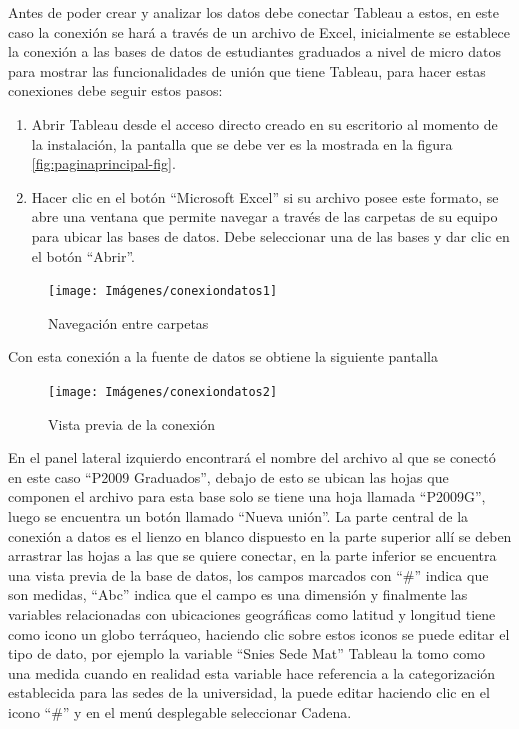 \documentclass[
]{book}
\begin{document}
Antes de poder crear y analizar los datos debe conectar Tableau a estos, en este caso la conexión se hará a través de un archivo de Excel, inicialmente se establece la conexión a las bases de datos de estudiantes graduados a nivel de micro datos para mostrar las funcionalidades de unión que tiene Tableau, para hacer estas conexiones debe seguir estos pasos:

\begin{enumerate}
\def\labelenumi{\arabic{enumi}.}
\item
  Abrir Tableau desde el acceso directo creado en su escritorio al momento de la instalación, la pantalla que se debe ver es la mostrada en la figura \ref{fig:paginaprincipal-fig}.
\item
  Hacer clic en el botón ``Microsoft Excel'' si su archivo posee este formato, se abre una ventana que permite navegar a través de las carpetas de su equipo para ubicar las bases de datos. Debe seleccionar una de las bases y dar clic en el botón ``Abrir''.
\end{enumerate}

\begin{figure}

{\centering \texttt{[image: Imágenes/conexiondatos1]} 

}

\caption{Navegación entre carpetas}\label{fig:carpetas-fig}
\end{figure}

Con esta conexión a la fuente de datos se obtiene la siguiente pantalla

\begin{figure}

{\centering \texttt{[image: Imágenes/conexiondatos2]} 

}

\caption{Vista previa de la conexión}\label{fig:pantallaconexiondatos-fig}
\end{figure}

En el panel lateral izquierdo encontrará el nombre del archivo al que se conectó en este caso ``P2009 Graduados'', debajo de esto se ubican las hojas que componen el archivo para esta base solo se tiene una hoja llamada ``P2009G'', luego se encuentra un botón llamado ``Nueva unión''. La parte central de la conexión a datos es el lienzo en blanco dispuesto en la parte superior allí se deben arrastrar las hojas a las que se quiere conectar, en la parte inferior se encuentra una vista previa de la base de datos, los campos marcados con ``\#'' indica que son medidas, ``Abc'' indica que el campo es una dimensión y finalmente las variables relacionadas con ubicaciones geográficas como latitud y longitud tiene como icono un globo terráqueo, haciendo clic sobre estos iconos se puede editar el tipo de dato, por ejemplo la variable ``Snies Sede Mat'' Tableau la tomo como una medida cuando en realidad esta variable hace referencia a la categorización establecida para las sedes de la universidad, la puede editar haciendo clic en el icono ``\#'' y en el menú desplegable seleccionar Cadena.
\end{document}
